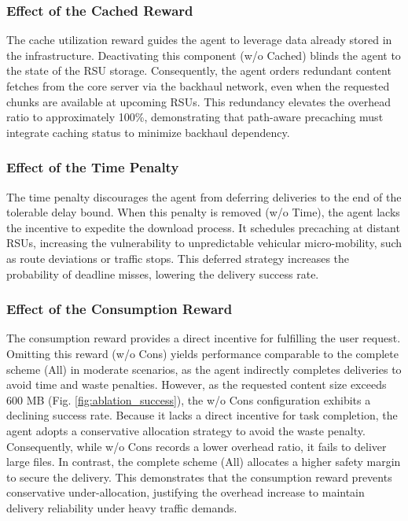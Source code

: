 \subsubsection{Effect of the Cached Reward}
The cache utilization reward guides the agent to leverage data already stored in the infrastructure. Deactivating this component (w/o Cached) blinds the agent to the state of the RSU storage. Consequently, the agent orders redundant content fetches from the core server via the backhaul network, even when the requested chunks are available at upcoming RSUs. This redundancy elevates the overhead ratio to approximately 100\%, demonstrating that path-aware precaching must integrate caching status to minimize backhaul dependency.
\subsubsection{Effect of the Time Penalty}
The time penalty discourages the agent from deferring deliveries to the end of the tolerable delay bound. When this penalty is removed (w/o Time), the agent lacks the incentive to expedite the download process. It schedules precaching at distant RSUs, increasing the vulnerability to unpredictable vehicular micro-mobility, such as route deviations or traffic stops. This deferred strategy increases the probability of deadline misses, lowering the delivery success rate.
\subsubsection{Effect of the Consumption Reward}
The consumption reward provides a direct incentive for fulfilling the user request. Omitting this reward (w/o Cons) yields performance comparable to the complete scheme (All) in moderate scenarios, as the agent indirectly completes deliveries to avoid time and waste penalties. However, as the requested content size exceeds 600 MB (Fig. \ref{fig:ablation_success}), the w/o Cons configuration exhibits a declining success rate. Because it lacks a direct incentive for task completion, the agent adopts a conservative allocation strategy to avoid the waste penalty. Consequently, while w/o Cons records a lower overhead ratio, it fails to deliver large files. In contrast, the complete scheme (All) allocates a higher safety margin to secure the delivery. This demonstrates that the consumption reward prevents conservative under-allocation, justifying the overhead increase to maintain delivery reliability under heavy traffic demands.
